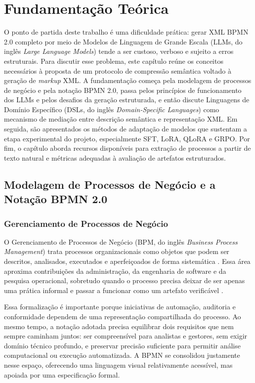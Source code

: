\chapter{Fundamentação Teórica}
\label{cap:fundamentacao-teorica}

O ponto de partida deste trabalho é uma dificuldade prática: gerar XML BPMN 2.0 completo por meio de Modelos de Linguagem de Grande Escala (LLMs, do inglês \textit{Large Language Models}) tende a ser custoso, verboso e sujeito a erros estruturais. Para discutir esse problema, este capítulo reúne os conceitos necessários à proposta de um protocolo de compressão semântica voltado à geração de \textit{markup} XML. A fundamentação começa pela modelagem de processos de negócio e pela notação BPMN 2.0, passa pelos princípios de funcionamento dos LLMs e pelos desafios da geração estruturada, e então discute Linguagens de Domínio Específico (DSLs, do inglês \textit{Domain-Specific Languages}) como mecanismo de mediação entre descrição semântica e representação XML. Em seguida, são apresentados os métodos de adaptação de modelos que sustentam a etapa experimental do projeto, especialmente SFT, LoRA, QLoRA e GRPO. Por fim, o capítulo aborda recursos disponíveis para extração de processos a partir de texto natural e métricas adequadas à avaliação de artefatos estruturados.

\section{Modelagem de Processos de Negócio e a Notação BPMN 2.0}
\label{sec:bpmn}

\subsection{Gerenciamento de Processos de Negócio}
\label{subsec:bpm}

O Gerenciamento de Processos de Negócio (BPM, do inglês \textit{Business Process Management}) trata processos organizacionais como objetos que podem ser descritos, analisados, executados e aperfeiçoados de forma sistemática \cite{dumas2018fundamentals}. Essa área aproxima contribuições da administração, da engenharia de software e da pesquisa operacional, sobretudo quando o processo precisa deixar de ser apenas uma prática informal e passar a funcionar como um artefato verificável \cite{weske2019business}.

Essa formalização é importante porque iniciativas de automação, auditoria e conformidade dependem de uma representação compartilhada do processo. Ao mesmo tempo, a notação adotada precisa equilibrar dois requisitos que nem sempre caminham juntos: ser compreensível para analistas e gestores, sem exigir domínio técnico profundo, e preservar precisão suficiente para permitir análise computacional ou execução automatizada. A BPMN se consolidou justamente nesse espaço, oferecendo uma linguagem visual relativamente acessível, mas apoiada por uma especificação formal.

